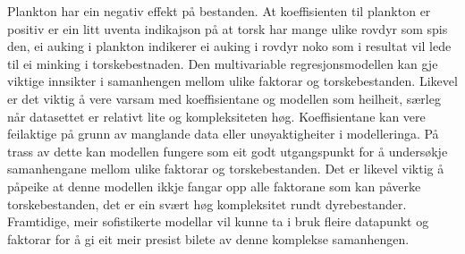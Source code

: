 \documentclass{report}
\begin{document}
Plankton har ein negativ effekt på bestanden. At koeffisienten til plankton er positiv er ein litt uventa indikajson på at torsk har mange ulike rovdyr som spis den, ei auking i plankton indikerer ei auking i rovdyr noko som i resultat vil lede til ei minking i torskebestnaden. 
Den multivariable regresjonsmodellen kan gje viktige innsikter i samanhengen mellom ulike faktorar og torskebestanden.
Likevel er det viktig å vere varsam med koeffisientane og modellen som heilheit, særleg når datasettet er relativt lite og kompleksiteten høg.
Koeffisientane kan vere feilaktige på grunn av manglande data eller unøyaktigheiter i modelleringa.
På trass av dette kan modellen fungere som eit godt utgangspunkt for å undersøkje samanhengane mellom ulike faktorar og torskebestanden.
Det er likevel viktig å påpeike at denne modellen ikkje fangar opp alle faktorane som kan påverke torskebestanden, det er ein svært høg kompleksitet rundt dyrebestander.
Framtidige, meir sofistikerte modellar vil kunne ta i bruk fleire datapunkt og faktorar for å gi eit meir presist bilete av denne komplekse samanhengen.
\end{document}

